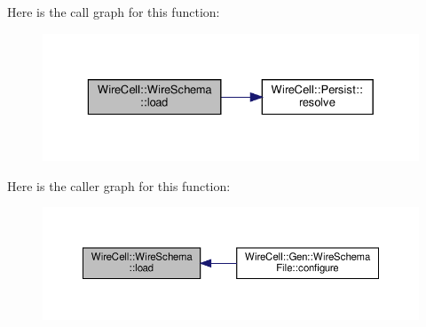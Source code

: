 Here is the call graph for this function\+:
\nopagebreak
\begin{figure}[H]
\begin{center}
\leavevmode
\includegraphics[width=329pt]{namespace_wire_cell_1_1_wire_schema_a0543dcae10ded4ff64c32a3e43743cbb_cgraph}
\end{center}
\end{figure}
Here is the caller graph for this function\+:
\nopagebreak
\begin{figure}[H]
\begin{center}
\leavevmode
\includegraphics[width=350pt]{namespace_wire_cell_1_1_wire_schema_a0543dcae10ded4ff64c32a3e43743cbb_icgraph}
\end{center}
\end{figure}
